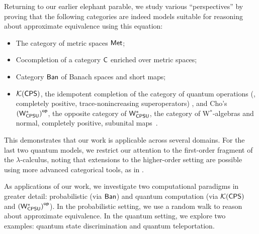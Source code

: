 Returning to our earlier elephant parable, we study various ``perspectives” by proving that the following categories are indeed models suitable for reasoning about approximate equivalence using this equation:
\begin{itemize}
\item The category of metric spaces $\mathsf{Met}$;
\item Cocompletion of a category $\mathsf{C}$ enriched over metric spaces;
\item Category $ \mathsf{Ban} $ of Banach spaces and short maps;
\item  \( \mathcal{K}{(\mathsf{CPS})} \), the idempotent completion of the category of quantum operations (\ie, completely positive, trace-nonincreasing superoperators) \cite{selinger2004towards}, and Cho’s \( \left(\mathsf{W^*_{CPSU}}\right)^{\mathsf{op}} \), the opposite category of \( \mathsf{W^*_{CPSU}} \), the category of W$^*$-algebras and normal, completely positive, subunital maps~\cite{choSemanticsQuantumProgramming2016}.
\end{itemize}
This demonstrates that our work is applicable across several domains. For the last two quantum models, we restrict our attention to the first-order fragment of the $\lambda$-calculus, noting that extensions to the higher-order setting are possible using more advanced categorical tools, as in \cite{dahlqvist2023syntactic}.

As applications of our work, we investigate two computational paradigms in greater detail: probabilistic (via $\mathsf{Ban}$) and quantum computation (via $\mathcal{K}{(\mathsf{CPS})}$ and $\left(\mathsf{W^*_{CPSU}}\right)^{\mathsf{op}}$). In the probabilistic setting, we use a random walk to reason about approximate equivalence. In the quantum setting, we explore two examples: quantum state discrimination and quantum teleportation.
 



